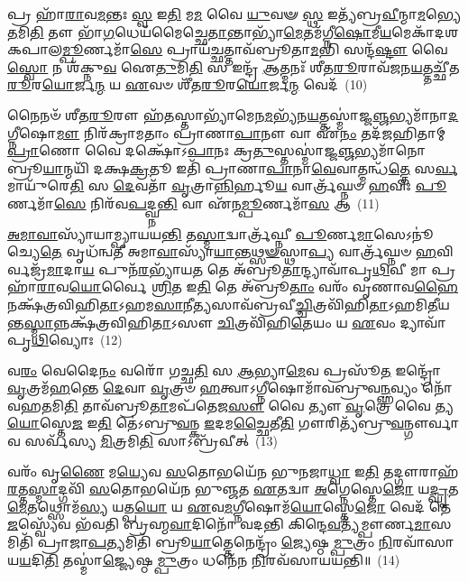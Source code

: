 𑌪𑍍𑌰 𑌹𑌾᳴\-\ul{𑌰𑌾}\-𑌵\-\ul{𑌮}\-𑌨𑍍𑌤𑌃 \ul{𑌸𑍍𑌵} 𑌇\-\ul{𑌤𑌿} 𑌮\-\ul{𑌮} 𑌵𑍈 \ul{𑌯𑍁}\-𑌵𑍟 \ul{𑌸𑍍𑌥} 𑌇𑌤𑍍𑌯᳴𑌬𑍍𑌰\-\ul{𑌵𑍀}\-𑌨𑍍𑌮𑌾\-\ul{𑌮}\-𑌭𑍍𑌯𑍇\-\ul{𑌤}\-𑌮𑌿\-\ul{𑌤𑌿} 𑌤𑍗 𑌭𑌾᳴\-\ul{𑌗}\-𑌧𑍇𑌯᳴𑌮𑍈𑌚𑍍𑌛𑍇\-\ul{𑌤𑌾}\-𑌨𑍍𑌤𑌾𑌭𑍍𑌯𑌾᳴\-\ul{𑌮𑍇}\-𑌤𑌮᳴𑌗𑍍𑌨𑍀\-\ul{𑌷𑍋}\-𑌮𑍀\-\ul{𑌯}\-\-𑌮𑍇𑌕𑌾᳴\-𑌦𑌶\-𑌕𑌪𑌾𑌲\-\ul{𑌮𑍍𑌪𑍂}\-𑌰𑍍𑌣𑌮𑌾᳴\-\ul{𑌸𑍇} 𑌪𑍍𑌰𑌾𑌯᳴\-\ul{𑌚𑍍𑌛}\-𑌤𑍍𑌤𑌾𑌵᳴𑌬𑍍𑌰𑍂𑌤𑌾\-\ul{𑌮}\-𑌭𑌿 𑌸𑌨𑍍𑌦᳴\-\ul{𑌷𑍍𑌟𑍗} 𑌵𑍈 \ul{𑌸𑍍𑌵𑍋} 𑌨 𑌶᳴𑌕𑍍𑌨𑍁\-\ul{𑌵} 𑌐\-\ul{𑌤𑍁}\-𑌮𑌿\-\ul{𑌤𑌿} 𑌸 𑌇𑌨𑍍𑌦𑍍𑌰᳴ \ul{𑌆}\-𑌤𑍍𑌮𑌨𑌃᳴ 𑌶𑍀𑌤\-\ul{𑌰𑍂}\-𑌰𑌾𑌵᳴𑌜𑌨\-\ul{𑌯}\-𑌤𑍍𑌤𑌚𑍍𑌛𑍀᳴𑌤\-\ul{𑌰𑍂}\-𑌰\-\ul{𑌯𑍋}\-𑌰𑍍𑌜\-\ul{𑌨𑍍𑌮} 𑌯 \ul{𑌏}\-𑌵𑍞 𑌶𑍀᳴𑌤\-\ul{𑌰𑍂}\-𑌰\-\ul{𑌯𑍋}\-𑌰𑍍𑌜\-\ul{𑌨𑍍𑌮} 𑌵𑍇𑌦᳴~(10)


𑌨𑍈𑌨𑍞᳴ 𑌶𑍀𑌤\-\ul{𑌰𑍂}\-𑌰𑍗 𑌹᳴\-\ul{𑌤}\-𑌸𑍍𑌤𑌾𑌭𑍍𑌯𑌾᳴𑌮𑍇𑌨\-\ul{𑌮}\-𑌭𑍍𑌯᳴𑌨\-\ul{𑌯}\-𑌤𑍍𑌤𑌸𑍍𑌮𑌾॑𑌜𑍍𑌜\-\ul{𑌞𑍍𑌜}\-𑌭𑍍𑌯𑌮𑌾᳴𑌨𑌾\-\ul{𑌦}\-𑌗𑍍𑌨𑍀𑌷𑍋\-\ul{𑌮𑍗} 𑌨𑌿𑌰᳴𑌕𑍍𑌰𑌾𑌮𑌤𑌾𑌂 𑌪𑍍𑌰𑌾𑌣𑌾\-\ul{𑌪𑌾}\-𑌨𑍗 𑌵𑌾 𑌏᳴\-\ul{𑌨𑌂} 𑌤𑌦᳴𑌜𑌹𑌿𑌤𑌾𑌮𑍍 \ul{𑌪𑍍𑌰𑌾}\-𑌣𑍋 𑌵𑍈 𑌦𑌕𑍍𑌷𑍋᳴\-𑌽\-\ul{𑌪𑌾}\-𑌨𑌃 𑌕𑍍𑌰\-\ul{𑌤𑍁}\-𑌸𑍍𑌤𑌸𑍍𑌮𑌾॑𑌜𑍍𑌜\-\ul{𑌞𑍍𑌜}\-𑌭𑍍𑌯𑌮𑌾᳴𑌨𑍋 𑌬𑍍𑌰𑍂\-\ul{𑌯𑌾}\-𑌨𑍍𑌮𑌯𑌿᳴ 𑌦𑌕𑍍𑌷\-\ul{𑌕𑍍𑌰}\-𑌤𑍂 𑌇𑌤𑌿᳴ 𑌪𑍍𑌰𑌾𑌣𑌾\-\ul{𑌪𑌾}\-𑌨𑌾\-\ul{𑌵𑍇}\-𑌵𑌾𑌤𑍍𑌮𑌨𑍍𑌧᳴\-\ul{𑌤𑍍𑌤𑍇} 𑌸\-\ul{𑌰𑍍𑌵}\-𑌮𑌾𑌯𑍁᳴𑌰𑍇\-\ul{𑌤𑌿} 𑌸 \ul{𑌦𑍇}\-𑌵𑌤𑌾᳴ \ul{𑌵𑍃}\-𑌤𑍍𑌰𑌾\-\ul{𑌨𑍍𑌨𑌿}\-𑌰𑍍\mbox{}𑌹𑍂\-\ul{𑌯} 𑌵𑌾𑌰𑍍𑌤𑍍𑌰᳴𑌘𑍍𑌨𑍞 \ul{𑌹}\-𑌵𑌿𑌃 \ul{𑌪𑍂}\-𑌰𑍍𑌣𑌮𑌾᳴\-\ul{𑌸𑍇} 𑌨𑌿𑌰᳴𑌵\-\ul{𑌪}\-𑌦𑍍𑌘𑍍𑌨\-\ul{𑌨𑍍𑌤𑌿} 𑌵𑌾 𑌏᳴𑌨\-\ul{𑌮𑍍𑌪𑍂}\-𑌰𑍍𑌣𑌮𑌾᳴\-\ul{𑌸} 𑌆~(11)

\-\ul{𑌅}\-\-\ul{𑌮𑌾}\-\-\ul{𑌵𑌾}\-𑌸𑍍𑌯𑌾᳴𑌯𑌾𑌮𑍍𑌪𑍍𑌯𑌾𑌯𑌯\-\ul{𑌨𑍍𑌤𑌿} 𑌤\-\ul{𑌸𑍍𑌮𑌾}\-𑌦𑍍𑌵𑌾𑌰𑍍𑌤𑍍𑌰᳴𑌘𑍍𑌨𑍀 \ul{𑌪𑍂}\-𑌰𑍍𑌣\-\ul{𑌮𑌾}\-𑌸𑍇\-𑌽𑌨𑍂॑𑌚𑍍𑌯𑍇\-\ul{𑌤𑍇} 𑌵𑍃𑌧᳴𑌨𑍍𑌵𑌤𑍀 𑌅𑌮𑌾\-\ul{𑌵𑌾}\-𑌸𑍍𑌯𑌾᳴\-\ul{𑌯𑌾}\-𑌨𑍍𑌤\-\ul{𑌥𑍍𑌸}\-\-\ul{𑍟}\-𑌸𑍍𑌥𑌾\-\ul{𑌪𑍍𑌯} 𑌵𑌾𑌰𑍍𑌤𑍍𑌰᳴𑌘𑍍𑌨𑍞 \ul{𑌹}\-𑌵𑌿𑌰𑍍𑌵𑌜𑍍𑌰᳴\-\ul{𑌮𑌾}\-𑌦𑌾\-\ul{𑌯} 𑌪𑍁𑌨᳴\-\ul{𑌰}\-𑌭𑍍𑌯𑌾᳴𑌯\-\ul{𑌤} 𑌤𑍇 𑌅᳴𑌬𑍍𑌰𑍂\-\ul{𑌤𑌾}\-𑌨𑍍𑌦𑍍𑌯𑌾𑌵𑌾᳴𑌪𑍃\-\ul{𑌥𑌿}\-𑌵𑍀 𑌮𑌾 𑌪𑍍𑌰 𑌹𑌾᳴\-\ul{𑌰𑌾}\-𑌵\-\ul{𑌯𑍋}\-𑌰𑍍𑌵𑍈 \ul{𑌶𑍍𑌰𑌿}\-𑌤 𑌇\-\ul{𑌤𑌿} 𑌤𑍇 𑌅᳴𑌬𑍍𑌰𑍂\-\ul{𑌤𑌾𑌂} 𑌵𑌰𑌂᳴ 𑌵𑍃𑌣𑌾𑌵\-\ul{𑌹𑍈} 𑌨𑌕𑍍𑌷᳴𑌤𑍍𑌰𑌵𑌿𑌹𑌿\-\ul{𑌤𑌾}\-\-𑌽𑌹𑌮\-\ul{𑌸𑌾}\-𑌨𑍀\-\ul{𑌤𑍍𑌯}\-𑌸𑌾𑌵᳴𑌬𑍍𑌰𑌵𑍀\-\ul{𑌚𑍍𑌚𑌿}\-𑌤𑍍𑌰𑌵𑌿᳴𑌹𑌿\-\ul{𑌤𑌾}\-\-𑌽𑌹𑌮𑌿\-\ul{𑌤𑍀}\-𑌯𑌨𑍍𑌤\-\ul{𑌸𑍍𑌮𑌾}\-𑌨𑍍𑌨𑌕𑍍𑌷᳴𑌤𑍍𑌰𑌵𑌿𑌹𑌿\-\ul{𑌤𑌾}\-\-𑌽𑌸𑍗 \ul{𑌚𑌿}\-𑌤𑍍𑌰𑌵𑌿᳴𑌹𑌿\-\ul{𑌤𑍇}\-𑌯𑌂 𑌯 \ul{𑌏}\-𑌵𑌂 𑌦𑍍𑌯𑌾𑌵𑌾᳴𑌪𑍃\-\ul{𑌥𑌿}\-𑌵𑍍𑌯𑍋𑌃~(12)

𑌵\-\ul{𑌰𑌂} 𑌵𑍇𑌦𑍈\-\ul{𑌨𑌂} 𑌵𑌰𑍋᳴ 𑌗𑌚𑍍𑌛\-\ul{𑌤𑌿} 𑌸 \ul{𑌆}\-𑌭𑍍𑌯𑌾\-\ul{𑌮𑍇}\-𑌵 𑌪𑍍𑌰𑌸𑍂᳴\-\ul{𑌤} 𑌇𑌨𑍍𑌦𑍍𑌰𑍋᳴ \ul{𑌵𑍃}\-𑌤𑍍𑌰𑌮᳴\-\ul{𑌹}\-𑌨𑍍𑌤𑍇 \ul{𑌦𑍇}\-𑌵𑌾 \ul{𑌵𑍃}\-𑌤𑍍𑌰𑍞 \ul{𑌹}\-𑌤𑍍𑌵𑌾\-𑌽𑌗𑍍𑌨𑍀𑌷𑍋𑌮𑌾᳴𑌵𑌬𑍍𑌰𑍁𑌵\-\ul{𑌨𑌼𑍍𑌹}\-𑌵𑍍𑌯𑌂 𑌨𑍋᳴ 𑌵𑌹\-\ul{𑌤}\-𑌮𑌿\-\ul{𑌤𑌿} 𑌤𑌾𑌵᳴𑌬𑍍𑌰𑍂\-\ul{𑌤𑌾}\-𑌮𑌪᳴𑌤𑍇𑌜\-\ul{𑌸𑍗} 𑌵𑍈 𑌤𑍍𑌯𑍗 \ul{𑌵𑍃}\-𑌤𑍍𑌰𑍇 𑌵𑍈 𑌤𑍍𑌯\-\ul{𑌯𑍋}\-𑌸𑍍𑌤𑍇\-\ul{𑌜} 𑌇\-\ul{𑌤𑌿} 𑌤𑍇॑\-𑌽𑌬𑍍𑌰𑍁\-\ul{𑌵}\-𑌨𑍍𑌕 \ul{𑌇}\-𑌦𑌮\-\ul{𑌚𑍍𑌛𑍈}\-𑌤𑍀\-\ul{𑌤𑌿} 𑌗𑍗𑌰𑌿𑌤𑍍𑌯᳴𑌬𑍍𑌰𑍁\-\ul{𑌵}\-𑌨𑍍𑌗𑍗𑌰𑍍𑌵𑌾𑌵 𑌸𑌰𑍍𑌵᳴𑌸𑍍𑌯 \ul{𑌮𑌿}\-𑌤𑍍𑌰𑌮𑌿\-\ul{𑌤𑌿} 𑌸𑌾\-𑌽𑌬𑍍𑌰᳴𑌵𑍀𑌤𑍍~(13)

𑌵𑌰𑌂᳴ 𑌵𑍃\-\ul{𑌣𑍈} 𑌮\-\ul{𑌯𑍍𑌯𑍇}\-𑌵 \ul{𑌸}\-𑌤𑍋𑌭𑌯𑍇᳴𑌨 𑌭𑍁𑌨𑌜𑌾\-\ul{𑌧𑍍𑌵𑌾} 𑌇\-\ul{𑌤𑌿} 𑌤𑌦𑍍𑌗𑍗𑌰𑌾𑌹᳴\-\ul{𑌰}\-𑌤𑍍𑌤\-\ul{𑌸𑍍𑌮𑌾}\-𑌦𑍍𑌗𑌵𑌿᳴ \ul{𑌸}\-𑌤𑍋𑌭𑌯𑍇᳴𑌨 𑌭𑍁𑌞𑍍𑌜𑌤 \ul{𑌏}\-𑌤𑌦𑍍𑌵𑌾 \ul{𑌅}\-𑌗𑍍𑌨𑍇𑌸𑍍𑌤𑍇\-\ul{𑌜𑍋} 𑌯\-\ul{𑌦𑍍𑌘𑍃}\-𑌤\-\ul{𑌮𑍇}\-𑌤𑌥𑍍𑌸𑍋𑌮᳴\-\ul{𑌸𑍍𑌯} 𑌯𑌤𑍍𑌪\-\ul{𑌯𑍋} 𑌯 \ul{𑌏}\-𑌵\-\ul{𑌮}\-𑌗𑍍𑌨𑍀𑌷𑍋𑌮᳴\-\ul{𑌯𑍋}\-𑌸𑍍𑌤𑍇\-\ul{𑌜𑍋} 𑌵𑍇𑌦᳴ 𑌤𑍇\-\ul{𑌜}\-𑌸𑍍𑌵𑍍𑌯𑍇᳴𑌵 𑌭᳴𑌵𑌤𑌿 𑌬𑍍𑌰𑌹𑍍𑌮\-\ul{𑌵𑌾}\-𑌦𑌿𑌨𑍋᳴ 𑌵𑌦𑌨𑍍𑌤𑌿 𑌕𑌿𑌨𑍍𑌦𑍇\-\ul{𑌵}\-𑌤𑍍𑌯᳴𑌮𑍍𑌪𑍗𑌰𑍍𑌣\-\ul{𑌮𑌾}\-𑌸𑌮𑌿𑌤𑌿᳴ 𑌪𑍍𑌰𑌾𑌜𑌾\-\ul{𑌪}\-𑌤𑍍𑌯𑌮𑌿𑌤𑌿᳴ 𑌬𑍍𑌰𑍂\-\ul{𑌯𑌾}\-𑌤𑍍𑌤𑍇𑌨𑍇𑌨𑍍𑌦𑍍𑌰𑌂᳴ \ul{𑌜𑍍𑌯𑍇}\-𑌷𑍍𑌠\-\ul{𑌮𑍍𑌪𑍁}\-𑌤𑍍𑌰𑌂 \ul{𑌨𑌿}\-𑌰𑌵𑌾᳴𑌸𑌾𑌯\-\ul{𑌯}\-𑌦𑌿\-\ul{𑌤𑌿} 𑌤𑌸𑍍𑌮𑌾॑\-\ul{𑌜𑍍𑌜𑍍𑌯𑍇}\-𑌷𑍍𑌠\-\ul{𑌮𑍍𑌪𑍁}\-𑌤𑍍𑌰𑌂 𑌧𑌨𑍇᳴𑌨 \ul{𑌨𑌿}\-𑌰𑌵᳴𑌸𑌾𑌯𑌯𑌨𑍍𑌤𑌿॥~(14)

